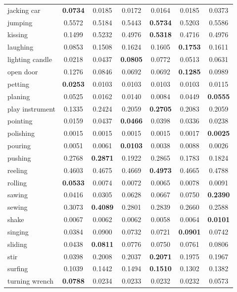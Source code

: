 \documentclass[10pt,twocolumn,letterpaper]{article}
\begin{document}
\begin{table}
\begin{center}
{\begin{tabular}{|l|c|c|c|c|c|c|}
jacking car & \textbf{0.0734} & 0.0185 & 0.0172 & 0.0164 & 0.0185 & 0.0373 \\ 
jumping & 0.5572 & 0.5184 & 0.5443 & \textbf{0.5734} & 0.5203 & 0.5586 \\ 
kissing & 0.1499 & 0.5232 & 0.4976 & \textbf{0.5318} & 0.4716 & 0.4976 \\ 
laughing & 0.0853 & 0.1508 & 0.1624 & 0.1605 & \textbf{0.1753} & 0.1611 \\ 
lighting candle & 0.0218 & 0.0437 & \textbf{0.0805} & 0.0772 & 0.0513 & 0.0631 \\ 
open door & 0.1276 & 0.0846 & 0.0692 & 0.0692 & \textbf{0.1285} & 0.0989 \\ 
petting & \textbf{0.0253} & 0.0103 & 0.0103 & 0.0103 & 0.0103 & 0.0115 \\ 
planing & 0.0525 & 0.0162 & 0.0140 & 0.0084 & 0.0449 & \textbf{0.0555} \\ 
play instrument & 0.1335 & 0.2424 & 0.2059 & \textbf{0.2705} & 0.2083 & 0.2059 \\ 
pointing & 0.0159 & 0.0437 & \textbf{0.0466} & 0.0398 & 0.0336 & 0.0238 \\ 
polishing & 0.0015 & 0.0015 & 0.0015 & 0.0015 & 0.0017 & \textbf{0.0025} \\ 
pouring & 0.0051 & 0.0061 & \textbf{0.0103} & 0.0038 & 0.0088 & 0.0026 \\ 
pushing & 0.2768 & \textbf{0.2871} & 0.1922 & 0.2865 & 0.1783 & 0.1824 \\ 
reeling & 0.4603 & 0.4675 & 0.4669 & \textbf{0.4973} & 0.4665 & 0.4788 \\ 
rolling & \textbf{0.0533} & 0.0074 & 0.0072 & 0.0065 & 0.0078 & 0.0091 \\ 
sawing & 0.0416 & 0.0305 & 0.0628 & 0.0667 & 0.0750 & \textbf{0.2390} \\ 
sewing & 0.3073 & \textbf{0.4089} & 0.2801 & 0.2839 & 0.2660 & 0.2588 \\ 
shake & 0.0067 & 0.0062 & 0.0062 & 0.0058 & 0.0064 & \textbf{0.0101} \\ 
singing & 0.0384 & 0.0900 & 0.0732 & 0.0721 & \textbf{0.0901} & 0.0742 \\ 
sliding & 0.0438 & \textbf{0.0811} & 0.0776 & 0.0750 & 0.0761 & 0.0806 \\ 
stir & 0.0398 & 0.2008 & 0.2037 & \textbf{0.2071} & 0.1975 & 0.1967 \\ 
surfing & 0.1039 & 0.1442 & 0.1494 & \textbf{0.1510} & 0.1302 & 0.1382 \\ 
turning wrench & \textbf{0.0788} & 0.0234 & 0.0233 & 0.0232 & 0.0232 & 0.0573 \\ 

\end{tabular}}
\end{center}
\end{table}
\end{document}
